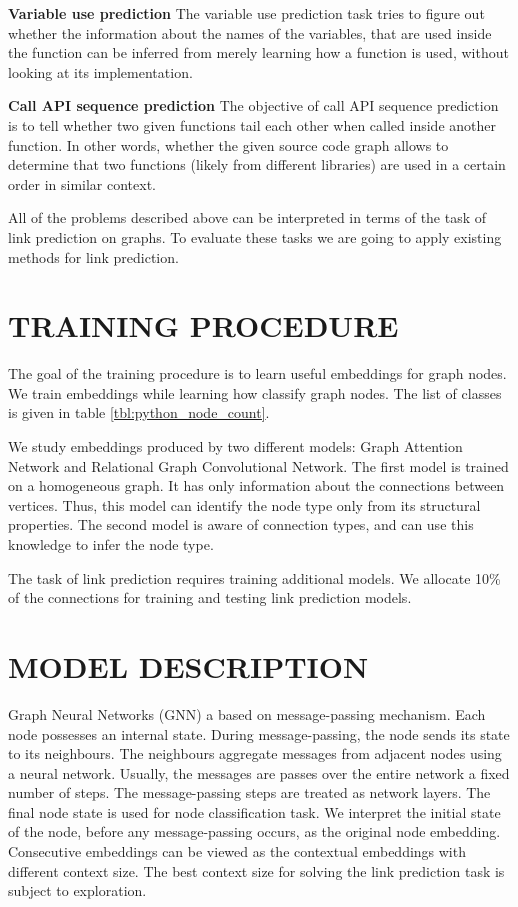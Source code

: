 \documentclass[a4paper,twoside]{article}
\begin{document}
\textbf{Variable use prediction}
The variable use prediction task tries to figure out whether the information about the names of the variables, that are used inside the function can be inferred from merely learning how a function is used, without looking at its implementation.

\textbf{Call API sequence prediction}
The objective of call API sequence prediction is to tell whether two given functions tail each other when called inside another function. In other words, whether the given source code graph allows to determine that two functions (likely from different libraries) are used in a certain order in similar context.

All of the problems described above can be interpreted in terms of the task of link prediction on graphs. To evaluate these tasks we are going to apply existing methods for link prediction. 

\section{\uppercase{Training Procedure}}

The goal of the training procedure is to learn useful embeddings for graph nodes. We train embeddings while learning how classify graph nodes. The list of classes is given in table \ref{tbl:python_node_count}.

We study embeddings produced by two different models: Graph Attention Network and Relational Graph Convolutional Network. The first model is trained on a homogeneous graph. It has only information about the connections between vertices. Thus, this model can identify the node type only from its structural properties. The second model is aware of connection types, and can use this knowledge to infer the node type.

The task of link prediction requires training additional models. We allocate 10\% of the connections for training and testing link prediction models.

\section{\uppercase{Model Description}}

Graph Neural Networks (GNN) a based on message-passing mechanism. Each node possesses an internal state. During message-passing, the node sends its state to its neighbours. The neighbours aggregate messages from adjacent nodes using a neural network. Usually, the messages are passes over the entire network a fixed number of steps. The message-passing steps are treated as network layers. The final node state is used for node classification task. We interpret the initial state of the node, before any message-passing occurs, as the original node embedding. Consecutive embeddings can be viewed as the contextual embeddings with different context size. The best context size for solving the link prediction task is subject to exploration.
\end{document}
